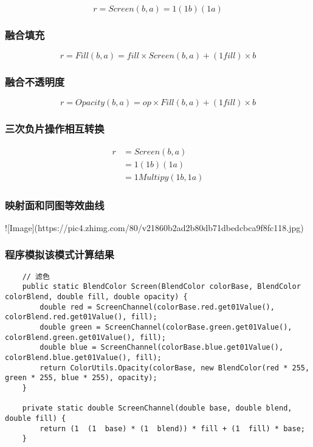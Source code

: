 $$r=Screen(b,a)=1(1b)(1a)$$

\subsubsection{ 融合填充}

$$r= Fill(b,a) =fill\times Screen(b,a)+(1fill)\times b$$

\subsubsection{ 融合不透明度}

$$r=Opacity(b,a)=op\times Fill(b,a)+(1fill)\times b$$

\subsubsection{ 三次负片操作相互转换}

$$\begin{aligned}
	r&=Screen(b,a)\\&=1(1b)(1a)\\&= 1 Multipy(1b,1a)
\end{aligned}$$

\subsubsection{ 映射面和同图等效曲线}

![Image](https://pic4.zhimg.com/80/v21860b2ad2b80db71dbedcbca9f8fc118.jpg)

\subsubsection{ 程序模拟该模式计算结果}

\begin{lstlisting}
	// 滤色
	public static BlendColor Screen(BlendColor colorBase, BlendColor colorBlend, double fill, double opacity) {
		double red = ScreenChannel(colorBase.red.get01Value(), colorBlend.red.get01Value(), fill);
		double green = ScreenChannel(colorBase.green.get01Value(), colorBlend.green.get01Value(), fill);
		double blue = ScreenChannel(colorBase.blue.get01Value(), colorBlend.blue.get01Value(), fill);
		return ColorUtils.Opacity(colorBase, new BlendColor(red * 255, green * 255, blue * 255), opacity);
	}
	
	private static double ScreenChannel(double base, double blend, double fill) {
		return (1  (1  base) * (1  blend)) * fill + (1  fill) * base;
	}
\end{lstlisting}


